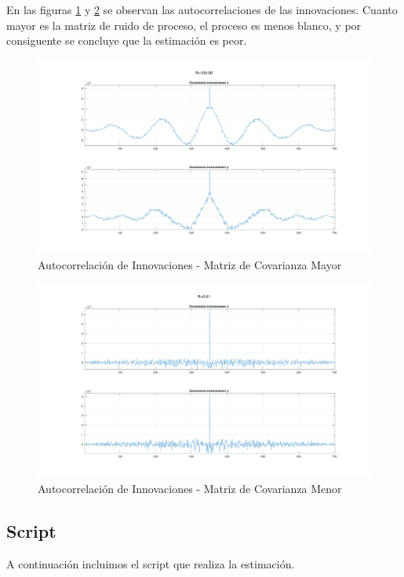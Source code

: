 	En las figuras \ref{fig:ej5r1_innov} y \ref{fig:ej5r2_innov} se observan las autocorrelaciones de las innovaciones. Cuanto mayor es la matriz de ruido de proceso, el proceso es menos blanco, y por consiguente se concluye que la estimación es peor.
	
	\begin{figure}[H]
		\centering
		\includegraphics[width=1.0\textwidth,keepaspectratio]{Figuras/covinn_ej6_R1.pdf}
		\caption{Autocorrelación de Innovaciones - Matriz de Covarianza Mayor}
		\label{fig:ej5r1_innov}
	\end{figure}
	
	\begin{figure}[H]
		\centering
		\includegraphics[width=1.0\textwidth,keepaspectratio]{Figuras/covinn_ej6_R2.pdf}
		\caption{Autocorrelación de Innovaciones - Matriz de Covarianza Menor}
		\label{fig:ej5r2_innov}
	\end{figure}
	

\subsection{Script}

	A continuación incluimos el script que realiza la estimación.
	
